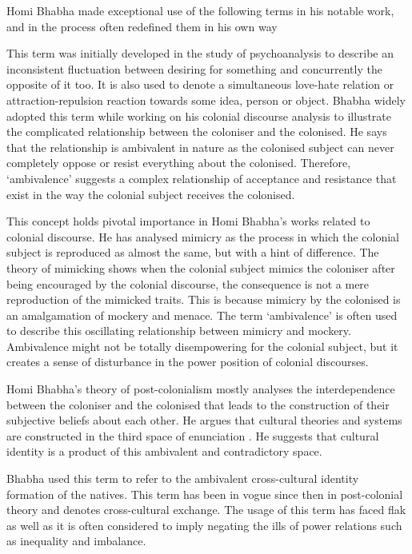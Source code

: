 Homi Bhabha made exceptional use of the following terms in his notable work, and in the process often redefined them in his own way

\begin{description}[leftmargin=0cm,labelindent=0cm]
 \item[Ambivalence:]
 This term was initially developed in the study of psychoanalysis to describe an inconsistent fluctuation between desiring for something and concurrently the opposite of it too. It is also used to denote a simultaneous love-hate relation or attraction-repulsion reaction towards some idea, person or object. Bhabha widely adopted this term while working on his colonial discourse analysis to illustrate the complicated relationship between the coloniser and the colonised. He says that the relationship is ambivalent in nature as the colonised subject can never completely oppose or resist everything about the colonised. Therefore, ‘ambivalence’ suggests a complex relationship of acceptance and resistance that exist in the way the colonial subject receives the colonised.

 \item[Mimicry:]
 This concept holds pivotal importance in Homi Bhabha’s works related to colonial discourse. He has analysed mimicry as the process in which the colonial subject is reproduced as almost the same, but with a hint of difference. The theory of mimicking shows when the colonial subject mimics the coloniser after being encouraged by the colonial discourse, the consequence is not a mere reproduction of the mimicked traits. This is because mimicry by the colonised is an amalgamation of mockery and menace. The term ‘ambivalence’ is often used to describe this oscillating relationship between mimicry and mockery. Ambivalence might not be totally disempowering for the colonial subject, but it creates a sense of disturbance in the power position of colonial discourses.
 
 Homi Bhabha’s theory of post-colonialism mostly analyses the interdependence between the coloniser and the colonised that leads to the construction of their subjective beliefs about each other. He argues that cultural theories and systems are constructed in the third space of enunciation \parencite[37]{Bhabha1994}. He suggests that cultural identity is a product of this ambivalent and contradictory space.
 
 \item[Hybridity:]
 Bhabha used this term to refer to the ambivalent cross-cultural identity formation of the natives. This term has been in vogue since then in post-colonial theory and denotes cross-cultural exchange. The usage of this term has faced flak as well as it is often considered to imply negating the ills of power relations such as inequality and imbalance. 
 

\end{description}

